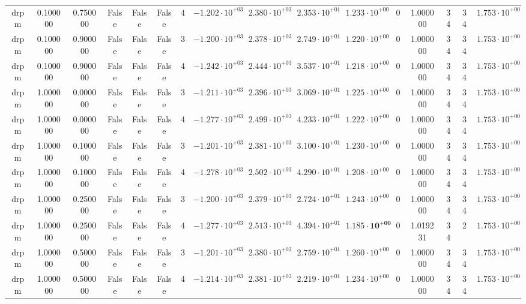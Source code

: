 \begin{table}
\begin{tabular}{cccccccccccccccc}
drpm & 0.100000 & 0.750000 & False & False & False & 4 & $-1.202 \cdot 10^{+03}$ & $2.380 \cdot 10^{+03}$ & $2.353 \cdot 10^{+01}$ & $1.233 \cdot 10^{+00}$ & 0 & 1.000000 & 34 & 34 & $1.753 \cdot 10^{+00}$ \\
drpm & 0.100000 & 0.900000 & False & False & False & 3 & $-1.200 \cdot 10^{+03}$ & $2.378 \cdot 10^{+03}$ & $2.749 \cdot 10^{+01}$ & $1.220 \cdot 10^{+00}$ & 0 & 1.000000 & 34 & 34 & $1.753 \cdot 10^{+00}$ \\
drpm & 0.100000 & 0.900000 & False & False & False & 4 & $-1.242 \cdot 10^{+03}$ & $2.444 \cdot 10^{+03}$ & $3.537 \cdot 10^{+01}$ & $1.218 \cdot 10^{+00}$ & 0 & 1.000000 & 34 & 34 & $1.753 \cdot 10^{+00}$ \\
drpm & 1.000000 & 0.000000 & False & False & False & 3 & $-1.211 \cdot 10^{+03}$ & $2.396 \cdot 10^{+03}$ & $3.069 \cdot 10^{+01}$ & $1.225 \cdot 10^{+00}$ & 0 & 1.000000 & 34 & 34 & $1.753 \cdot 10^{+00}$ \\
drpm & 1.000000 & 0.000000 & False & False & False & 4 & $-1.277 \cdot 10^{+03}$ & $2.499 \cdot 10^{+03}$ & $4.233 \cdot 10^{+01}$ & $1.222 \cdot 10^{+00}$ & 0 & 1.000000 & 34 & 34 & $1.753 \cdot 10^{+00}$ \\
drpm & 1.000000 & 0.100000 & False & False & False & 3 & $-1.201 \cdot 10^{+03}$ & $2.381 \cdot 10^{+03}$ & $3.100 \cdot 10^{+01}$ & $1.230 \cdot 10^{+00}$ & 0 & 1.000000 & 34 & 34 & $1.753 \cdot 10^{+00}$ \\
drpm & 1.000000 & 0.100000 & False & False & False & 4 & $-1.278 \cdot 10^{+03}$ & $2.502 \cdot 10^{+03}$ & $4.290 \cdot 10^{+01}$ & $1.208 \cdot 10^{+00}$ & 0 & 1.000000 & 34 & 34 & $1.753 \cdot 10^{+00}$ \\
drpm & 1.000000 & 0.250000 & False & False & False & 3 & $-1.200 \cdot 10^{+03}$ & $2.379 \cdot 10^{+03}$ & $2.724 \cdot 10^{+01}$ & $1.243 \cdot 10^{+00}$ & 0 & 1.000000 & 34 & 34 & $1.753 \cdot 10^{+00}$ \\
drpm & 1.000000 & 0.250000 & False & False & False & 4 & $-1.277 \cdot 10^{+03}$ & $2.513 \cdot 10^{+03}$ & $4.394 \cdot 10^{+01}$ & $\mathbf{1.185 \cdot 10^{+00}}$ & 0 & 1.019231 & 34 & 2 & $1.753 \cdot 10^{+00}$ \\
drpm & 1.000000 & 0.500000 & False & False & False & 3 & $-1.201 \cdot 10^{+03}$ & $2.380 \cdot 10^{+03}$ & $2.759 \cdot 10^{+01}$ & $1.260 \cdot 10^{+00}$ & 0 & 1.000000 & 34 & 34 & $1.753 \cdot 10^{+00}$ \\
drpm & 1.000000 & 0.500000 & False & False & False & 4 & $-1.214 \cdot 10^{+03}$ & $2.381 \cdot 10^{+03}$ & $2.219 \cdot 10^{+01}$ & $1.234 \cdot 10^{+00}$ & 0 & 1.000000 & 34 & 34 & $1.753 \cdot 10^{+00}$ \\

\end{tabular}
\end{table}
